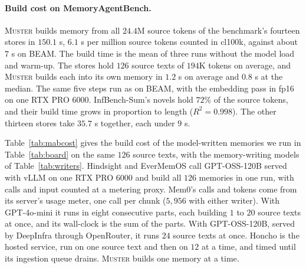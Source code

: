 \documentclass{article}
\newcommand{\sys}{\textsc{Muster}}
\begin{document}
\paragraph{Build cost on MemoryAgentBench.} \sys{} builds memory from all $24.4$M source tokens of the benchmark's fourteen stores in $150.1$ s, $6.1$ s per million source tokens counted in cl100k, against about $7$ s on BEAM. The build time is the mean of three runs without the model load and warm-up. The stores hold $126$ source texts of $194$K tokens on average, and \sys{} builds each into its own memory in $1.2$ s on average and $0.8$ s at the median. The same five steps run as on BEAM, with the embedding pass in fp16 on one RTX PRO 6000. InfBench-Sum's novels hold $72\%$ of the source tokens, and their build time grows in proportion to length ($R^2=0.998$). The other thirteen stores take $35.7$ s together, each under $9$ s.

Table~\ref{tab:mabcost} gives the build cost of the model-written memories we run in Table~\ref{tab:board} on the same $126$ source texts, with the memory-writing models of Table~\ref{tab:writers}. Hindsight and EverMemOS call GPT-OSS-120B served with vLLM on one RTX PRO 6000 and build all $126$ memories in one run, with calls and input counted at a metering proxy. Mem0's calls and tokens come from its server's usage meter, one call per chunk ($5{,}956$ with either writer). With GPT-4o-mini it runs in eight consecutive parts, each building $1$ to $20$ source texts at once, and its wall-clock is the sum of the parts. With GPT-OSS-120B, served by DeepInfra through OpenRouter, it runs $24$ source texts at once. Honcho is the hosted service, run on one source text and then on $12$ at a time, and timed until its ingestion queue drains. \sys{} builds one memory at a time.
\end{document}
